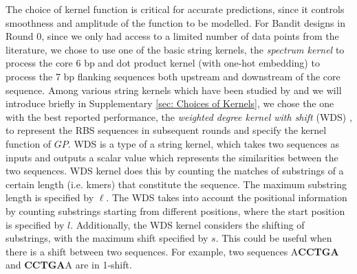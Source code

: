 \documentclass{scrartcl}[2013/05/29]%
\begin{document}

The choice of kernel function is critical for accurate predictions, since it controls smoothness and amplitude of the function to be modelled.
For Bandit designs in Round 0, since we only had access to a limited number of data points from the literature, we chose to use one of the basic string kernels, the \textit{spectrum kernel} \cite{leslie2001spectrum} to process the core 6 bp and dot product kernel \cite{Rasmussen2004} (with one-hot embedding) to process the 7 bp flanking sequences both upstream and downstream of the core sequence.
Among various string kernels which have been studied by \mbox{\textcite{Ben-Hur2008}} and we will introduce briefly in Supplementary \mbox{\ref{sec: Choices of Kernels}}, we chose the one with the best reported performance, the \textit{weighted degree kernel with shift} (WDS) \mbox{\cite{ratsch_rase_2005_wds, Ben-Hur2008}},  
to represent the RBS sequences in subsequent rounds and specify the kernel function of $GP$. 
WDS is a type of a string kernel, which takes two sequences as inputs and outputs a scalar value which represents the similarities between the two sequences.  
WDS kernel does this by counting the matches of substrings of a certain length (i.e. kmers) that constitute the sequence.
The maximum substring length is specified by $\ell$.
The WDS takes into account the positional information by counting substrings starting from different positions, where the start position is specified by $l$.
Additionally, the WDS kernel considers the shifting of substrings, with the maximum shift specified by $s$.
This could be useful when there is a shift between two sequences.
For example, two sequences A\textbf{CCTGA} and \textbf{CCTGA}A are in 1-shift. \\
\end{document}
